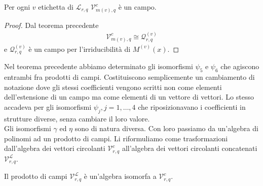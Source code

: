 \begin{corollario}
   Per ogni $v$ etichetta di $\mathscr{L}_{r,q} $  $\mathcal{V}_{m(v),q}^{c}$ è un campo.
\end{corollario}
\begin{proof}
   Dal teorema precedente
     \begin{align*}
     \mathcal{V}_{m(v),q}^{c}
     \cong
     \mathcal{Q}_{r,q}^{(v)}
  \end{align*}
  e $\mathcal{Q}_{r,q}^{(v)}$ è un campo per l'irriducibilità di $M^{(v)}(x)$.
\end{proof}

Nel teorema precedente abbiamo determinato gli isomorfismi $\psi_{5}$ e $\psi_{6}$ che agiscono entrambi fra prodotti di campi.
Costituiscono semplicemente un cambiamento di notazione dove gli stessi coefficienti vengono scritti non come elementi dell'estensione di un campo ma come elementi di un vettore di vettori. Lo stesso accadeva per gli isomorfismi $\psi_{j}, j=1,\dots , 4$ che riposizionavano i coefficienti in strutture diverse, senza cambiare il loro valore.\\
Gli isomorfismi $\gamma$ ed $\eta$ sono di natura diversa. Con loro passiamo da un'algebra di polinomi ad un prodotto di campi. Li riformuliamo come trasformazioni dall'algebra dei vettori circolanti $\mathcal{V}_{r,q}^{c} $ all'algebra dei vettori circolanti concatenati $\mathcal{V}_{r,q}^{\mathscr{L} } $.
\begin{corollario}
   Il prodotto di campi $\mathcal{V}_{r,q}^{\mathscr{L} } $ è un'algebra isomorfa a $\mathcal{V}_{r,q}^{c} $.
\end{corollario}
